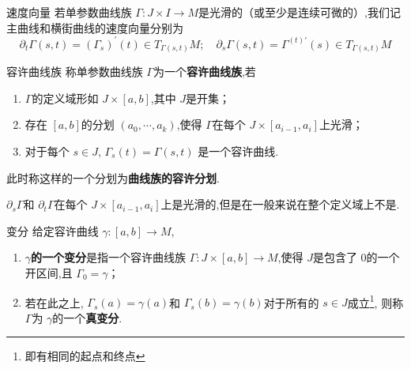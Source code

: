 \documentclass[../../几何与拓扑.tex]{subfiles}
\begin{document}
\begin{definition}{速度向量}
    若单参数曲线族 \(   \Gamma :J\times I\to M  \)是光滑的（或至少是连续可微的）,我们记主曲线和横街曲线的速度向量分别为 \[
    \partial _{t} \Gamma \left( s,t \right) = \left(  \Gamma _{s} \right)^{\prime} \left( t \right)\in T_{ \Gamma \left( s,t \right) }M;\quad  \partial _{s} \Gamma \left( s,t \right)=  \Gamma ^{\left( t \right)\prime }  \left( s \right) \in T_{ \Gamma \left( s,t \right) }M 
    \] 
\end{definition}

\begin{definition}{容许曲线族}
    称单参数曲线族 \(   \Gamma   \)为一个\textbf{容许曲线族},若
    \begin{enumerate}
        \item \(   \Gamma   \)的定义域形如 \(  J\times \left[ a,b \right]   \),其中 \(  J  \)是开集；
        \item 存在 \(  \left[ a,b \right]   \)的分划 \(  \left(  a_0,\cdots,a_{k}    \right)   \),使得 \(   \Gamma   \)在每个 \(  J\times \left[ a_{i-1},a_{i} \right]   \)上光滑；
        \item 对于每个 \(  s \in J  \),  \(   \Gamma _{s}\left( t \right)=  \Gamma \left( s,t \right)    \)    是一个容许曲线.    
    \end{enumerate}
    此时称这样的一个分划为\textbf{曲线族的容许分划}.
\end{definition} 

\begin{remark}
    \(  \partial _{s} \Gamma   \)和 \(  \partial _{t} \Gamma   \)在每个 \(  J\times \left[ a_{i-1},a_{i} \right]   \)上是光滑的,但是在一般来说在整个定义域上不是.   
\end{remark}

\begin{definition}{变分}
    给定容许曲线 \(   \gamma :\left[ a,b \right]\to M   \),
    \begin{enumerate}
        \item \textbf{\(   \gamma   \)的一个变分}是指一个容许曲线族 \(   \Gamma: J\times \left[ a,b \right]\to M   \),使得 \(  J  \)是包含了 \(  0  \)的一个开区间,且 \(   \Gamma _{0}=  \gamma   \)；
        \item 若在此之上, \(   \Gamma _{s}\left( a \right)=  \gamma \left( a \right)    \)和 \(   \Gamma _{s}\left( b \right)=  \gamma \left( b \right)    \)对于所有的 \(  s \in J  \)成立\footnote{即有相同的起点和终点},  则称 \(   \Gamma   \)为 \(   \gamma   \)的一个\textbf{真变分}.   
    \end{enumerate}
     
\end{definition}
\end{document}
